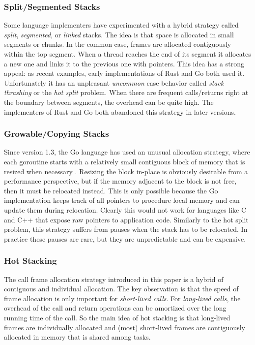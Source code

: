 \documentclass[acmsmall,anonymous,review]{acmart}\settopmatter{printfolios=true,printccs=false,printacmref=false}
\begin{document}
\subsubsection{Split/Segmented Stacks}

Some language implementers have experimented with a hybrid strategy called \emph{split}, \emph{segmented}, or \emph{linked} stacks.
The idea is that space is allocated in small segments or chunks.
In the common case, frames are allocated contiguously within the top segment.
When a thread reaches the end of its segment it allocates a new one and links it to the previous one with pointers.
This idea has a strong appeal: as recent examples, early implementations of Rust and Go both used it.
Unfortunately it has an unpleasant \emph{uncommon} case behavior called \emph{stack thrashing} or the \emph{hot split} problem.
When there are frequent calls/returns right at the boundary between segments, the overhead can be quite high.
The implementers of Rust \cite{Anderson2013} and Go \cite{Anastasopoulos2014} both abandoned this strategy in later versions.


\subsubsection{Growable/Copying Stacks}
\label{sec:go_stacks}

Since version 1.3, the Go language has used an unusual allocation strategy, where each goroutine starts with a relatively small contiguous block of memory that is resized when necessary \cite{Cheney2014, Morsing2014}.
Resizing the block in-place is obviously desirable from a performance perspective, but if the memory adjacent to the block is not free, then it must be relocated instead.
This is only possible because the Go implementation keeps track of all pointers to procedure local memory and can update them during relocation.
Clearly this would not work for languages like C and C++ that expose raw pointers to application code.
Similarly to the hot split problem, this strategy suffers from pauses when the stack has to be relocated.
In practice these pauses are rare, but they are unpredictable and can be expensive.

\subsubsection{Hot Stacking}

The call frame allocation strategy introduced in this paper is a hybrid of contiguous and individual allocation.
The key observation is that the speed of frame allocation is only important for \emph{short-lived calls}.
For \emph{long-lived calls}, the overhead of the call and return operations can be amortized over the long running time of the call.
So the main idea of hot stacking is that long-lived frames are individually allocated and (most) short-lived frames are contiguously allocated in memory that is shared among tasks.
\end{document}
